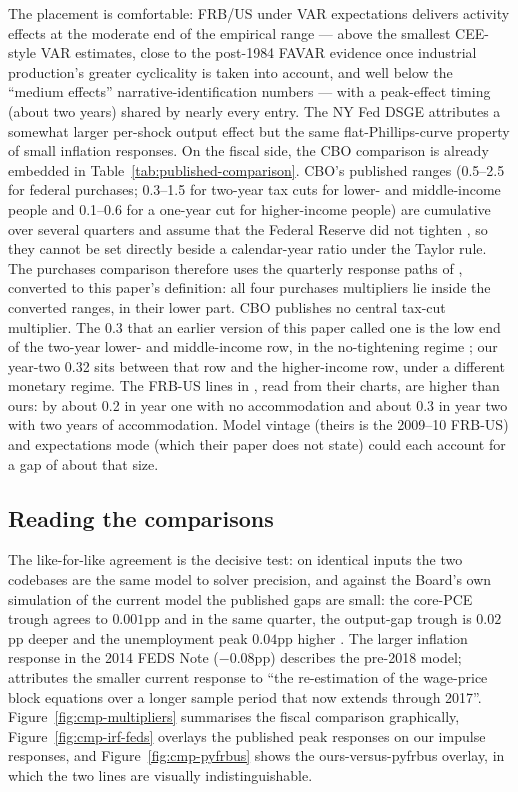 The placement is comfortable: FRB/US under VAR expectations delivers activity effects at the moderate end of the empirical range --- above the smallest CEE-style VAR estimates, close to the post-1984 FAVAR evidence once industrial production's greater cyclicality is taken into account, and well below the ``medium effects'' narrative-identification numbers --- with a peak-effect timing (about two years) shared by nearly every entry. The NY Fed DSGE attributes a somewhat larger per-shock output effect but the same flat-Phillips-curve property of small inflation responses. On the fiscal side, the CBO comparison is already embedded in Table~\ref{tab:published-comparison}. CBO's published ranges (0.5--2.5 for federal purchases; 0.3--1.5 for two-year tax cuts for lower- and middle-income people and 0.1--0.6 for a one-year cut for higher-income people) are cumulative over several quarters and assume that the Federal Reserve did not tighten \citep[Table~3 and its note~a]{cbo2015arra}, so they cannot be set directly beside a calendar-year ratio under the Taylor rule. The purchases comparison therefore uses the quarterly response paths of \citet[Table~2]{whalen2015fiscal}, converted to this paper's definition: all four purchases multipliers lie inside the converted ranges, in their lower part. CBO publishes no central tax-cut multiplier. The 0.3 that an earlier version of this paper called one is the low end of the two-year lower- and middle-income row, in the no-tightening regime \citep{frbbenchmarks2026}; our year-two 0.32 sits between that row and the higher-income row, under a different monetary regime. The FRB-US lines in \citet{coenen2012effects}, read from their charts, are higher than ours: by about 0.2 in year one with no accommodation and about 0.3 in year two with two years of accommodation. Model vintage (theirs is the 2009--10 FRB-US) and expectations mode (which their paper does not state) could each account for a gap of about that size.

\subsection{Reading the comparisons}

The like-for-like agreement is the decisive test: on identical inputs the two codebases are the same model to solver precision, and against the Board's own simulation of the current model the published gaps are small: the core-PCE trough agrees to $0.001$pp and in the same quarter, the output-gap trough is $0.02$pp deeper and the unemployment peak $0.04$pp higher \citep{laforte2018changes}. The larger inflation response in the 2014 FEDS Note ($-0.08$pp) describes the pre-2018 model; \citet{laforte2018changes} attributes the smaller current response to ``the re-estimation of the wage-price block equations over a longer sample period that now extends through 2017''. Figure~\ref{fig:cmp-multipliers} summarises the fiscal comparison graphically, Figure~\ref{fig:cmp-irf-feds} overlays the published peak responses on our impulse responses, and Figure~\ref{fig:cmp-pyfrbus} shows the ours-versus-pyfrbus overlay, in which the two lines are visually indistinguishable.

